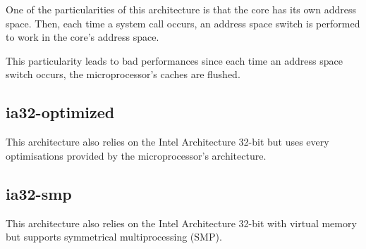 One of the particularities of this architecture is that the core has its
own address space. Then, each time a system call occurs, an address space
switch is performed to work in the core's address space.

This particularity leads to bad performances since each time an address
space switch occurs, the microprocessor's caches are flushed.

%
%

\subsection{ia32-optimized}

This architecture also relies on the Intel Architecture 32-bit but uses
every optimisations provided by the microprocessor's architecture.


%
%

\subsection{ia32-smp}

This architecture also relies on the Intel Architecture 32-bit with
virtual memory but supports symmetrical multiprocessing (SMP).


